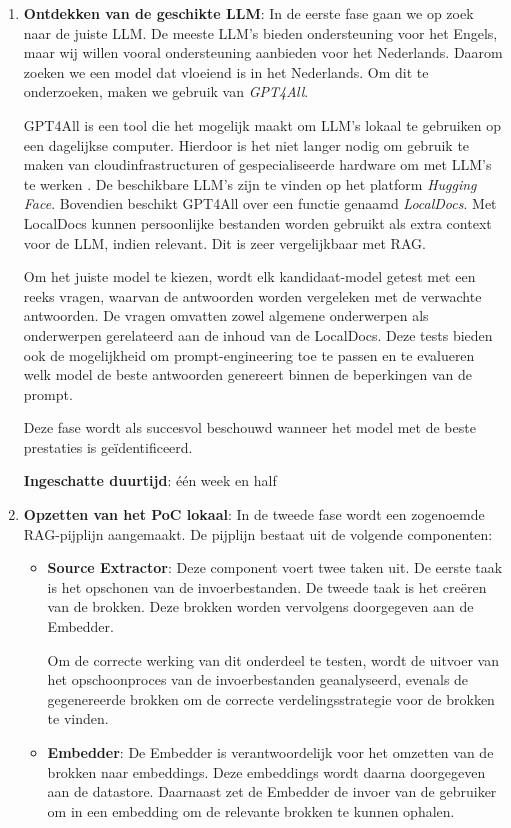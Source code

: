 \begin{enumerate}
    \item \textbf{Ontdekken van de geschikte \acrshort{LLM}}: In de eerste fase gaan we op zoek naar de juiste \acrshort{LLM}. De meeste \acrshort{LLM}'s bieden ondersteuning voor het Engels, maar wij willen vooral ondersteuning aanbieden voor het Nederlands. Daarom zoeken we een model dat vloeiend is in het Nederlands. Om dit te onderzoeken, maken we gebruik van \textit{GPT4All}.
    
    GPT4All is een tool die het mogelijk maakt om \acrshort{LLM}'s lokaal te gebruiken op een dagelijkse computer. Hierdoor is het niet langer nodig om gebruik te maken van cloudinfrastructuren of gespecialiseerde hardware om met \acrshort{LLM}'s te werken \autocite{NST2024}. De beschikbare \acrshort{LLM}'s zijn te vinden op het platform \textit{Hugging Face}. Bovendien beschikt GPT4All over een functie genaamd \textit{LocalDocs}. Met LocalDocs kunnen persoonlijke bestanden worden gebruikt als extra context voor de \acrshort{LLM}, indien relevant. Dit is zeer vergelijkbaar met RAG.
    
    Om het juiste model te kiezen, wordt elk kandidaat-model getest met een reeks vragen, waarvan de antwoorden worden vergeleken met de verwachte antwoorden. De vragen omvatten zowel algemene onderwerpen als onderwerpen gerelateerd aan de inhoud van de LocalDocs. Deze tests bieden ook de mogelijkheid om prompt-engineering toe te passen en te evalueren welk model de beste antwoorden genereert binnen de beperkingen van de prompt.
    
    Deze fase wordt als succesvol beschouwd wanneer het model met de beste prestaties is geïdentificeerd. 
    
    \textbf{Ingeschatte duurtijd}: één week en half
    
    \item \textbf{Opzetten van het PoC lokaal}: In de tweede fase wordt een zogenoemde RAG-pijplijn aangemaakt. De pijplijn bestaat uit de volgende componenten: 
    \begin{itemize} 
        \item \textbf{Source Extractor}: Deze component voert twee taken uit. De eerste taak is het opschonen van de invoerbestanden. De tweede taak is het creëren van de brokken. Deze brokken worden vervolgens doorgegeven aan de Embedder. 
               
        Om de correcte werking van dit onderdeel te testen, wordt de uitvoer van het opschoonproces van de invoerbestanden geanalyseerd, evenals de gegenereerde brokken om de correcte verdelingsstrategie voor de brokken te vinden. 
        \item \textbf{Embedder}: De Embedder is verantwoordelijk voor het omzetten van de brokken naar embeddings. Deze embeddings wordt daarna doorgegeven aan de datastore. Daarnaast zet de Embedder de invoer van de gebruiker om in een embedding om de relevante brokken te kunnen ophalen. 
        

\end{itemize}
\end{enumerate}
